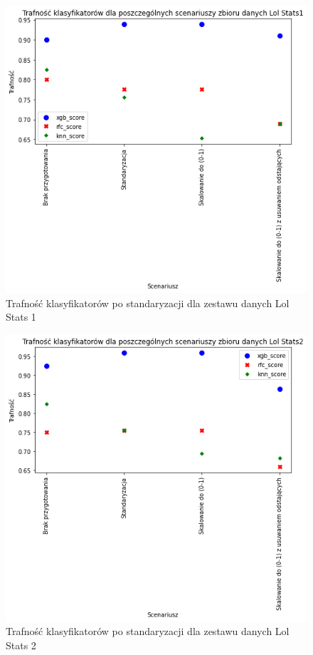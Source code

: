 \documentclass{book}
\begin{document}
\begin{figure}[H]
\centerline{\includegraphics{Lol_Stats_1_Standaryzacja}}
\centering
\caption{Trafność klasyfikatorów po standaryzacji dla zestawu danych Lol Stats 1}
\end{figure}

\begin{figure}[H]
\centerline{\includegraphics{Lol_Stats_2_Standaryzacja}}
\centering
\caption{Trafność klasyfikatorów po standaryzacji dla zestawu danych Lol Stats 2}
\end{figure}
\end{document}

